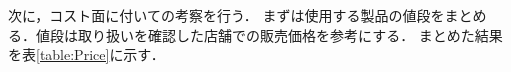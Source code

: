 \documentclass[uplatex,dvipdfmx]{jsarticle}
\begin{document}










次に，コスト面に付いての考察を行う．
まずは使用する製品の値段をまとめる．値段は取り扱いを確認した店舗での販売価格を参考にする．
まとめた結果を表\ref{table:Price}に示す．
\end{document}
